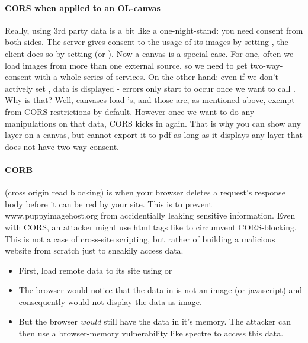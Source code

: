 \paragraph{CORS when applied to an OL-canvas} Really, using 3rd party data is a bit like a one-night-stand: you need consent from both sides. The server gives consent to the usage of its images by setting , the client does so by setting  (or ). 
Now a canvas is a special case. For one, often we load images from more than one external source, so we need to get two-way-consent with a whole series of services. On the other hand: even if we don't actively set , data is displayed - errors only start to occur once we want to call . Why is that? Well, canvases load 's, and those are, as mentioned above, exempt from CORS-restrictions by default. However once we want to do any manipulations on that data, CORS kicks in again.
That is why you can show any layer on a canvas, but cannot export it to pdf as long as it displays any layer that does not have two-way-consent.

\paragraph{CORB} (cross origin read blocking) is when your browser deletes a request's response body before it can be red by your site. This is to prevent www.puppyimagehost.org from accidentially leaking sensitive information.
Even with CORS, an attacker might use html tags like  to circumvent CORS-blocking. This is not a case of cross-site scripting, but rather of building a malicious website from scratch just to sneakily access data.
\begin{itemize}
	\item First, load remote data to its site using  or 
	\item The browser would notice that the data in  is not an image (or javascript) and consequently would not display the data as image. 
	\item But the browser \emph{would} still have the data in it's memory. The attacker can then use a browser-memory vulnerability like spectre to access this data. 
\end{itemize}

